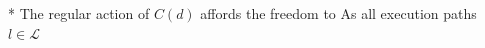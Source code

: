 * The regular action of $C(d)$ affords the freedom to As all execution paths $l\in\mathcal{L}$

%
%
%






